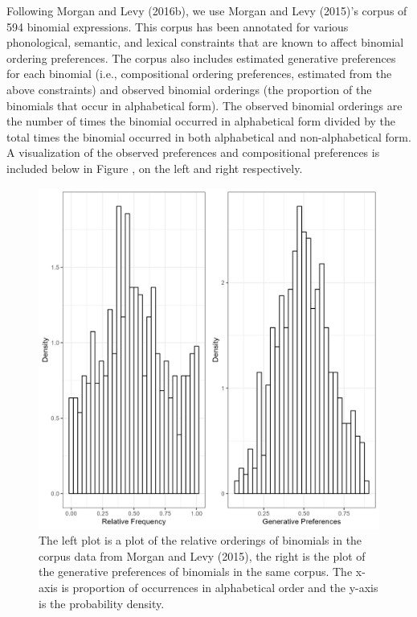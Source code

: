 \documentclass[
  jou,floatsintext]{apa6}
\begin{document}
Following Morgan and Levy (2016b), we use Morgan and Levy (2015)'s corpus of 594 binomial expressions. This corpus has been annotated for various phonological, semantic, and lexical constraints that are known to affect binomial ordering preferences. The corpus also includes estimated generative preferences for each binomial (i.e., compositional ordering preferences, estimated from the above constraints) and observed binomial orderings (the proportion of the binomials that occur in alphabetical form). The observed binomial orderings are the number of times the binomial occurred in alphabetical form divided by the total times the binomial occurred in both alphabetical and non-alphabetical form. A visualization of the observed preferences and compositional preferences is included below in Figure , on the left and right respectively.



\begin{figure}

{\centering \includegraphics[width=1\linewidth]{Figures/corpus_plots} 

}

\caption{The left plot is a plot of the relative orderings of binomials in the corpus data from Morgan and Levy (2015), the right is the plot of the generative preferences of binomials in the same corpus. The x-axis is proportion of occurrences in alphabetical order and the y-axis is the probability density.}\label{fig:corpusplot1}
\end{figure}
\end{document}
